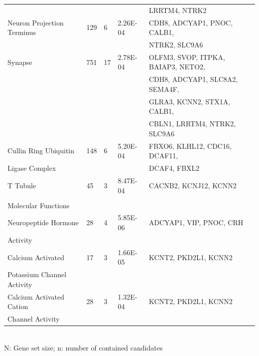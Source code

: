 \begin{refsection}
\begin{table}[H]
\begin{tabular}{@{}lllll@{}}
                           &     &    &            & LRRTM4, NTRK2                      \\
Neuron Projection Terminus & 129 & 6  & 2.26E-04   & CDH8, ADCYAP1, PNOC, CALB1,        \\
                           &     &    &            & NTRK2, SLC9A6                      \\
Synapse                    & 751 & 17 & 2.78E-04   & OLFM3, SVOP, ITPKA, BAIAP3, NETO2, \\
                           &     &    &            & CDH8, ADCYAP1, SLC8A2, SEMA4F,     \\
                           &     &    &            & GLRA3, KCNN2, STX1A, CALB1,        \\
                           &     &    &            & CBLN1, LRRTM4, NTRK2, SLC9A6       \\
Cullin Ring Ubiquitin      & 148 & 6  & 5.20E-04   & FBXO6, KLHL12, CDC16, DCAF11,      \\
Ligase Complex             &     &    &            & DCAF4, FBXL2                       \\
T Tubule                   & 45  & 3  & 8.47E-04   & CACNB2, KCNJ12, KCNN2              \\
                           &     &    &            &                                    \\
Molecular Functions        &     &    &            &                                    \\
Neuropeptide Hormone       & 28  & 4  & 5.85E-06   & ADCYAP1, VIP, PNOC, CRH            \\
Activity                   &     &    &            &                                    \\
Calcium Activated          & 17  & 3  & 1.66E-05   & KCNT2, PKD2L1, KCNN2               \\
Potassium Channel Activity &     &    &            &                                    \\
Calcium Activated Cation   & 28  & 3  & 1.32E-04   & KCNT2, PKD2L1, KCNN2               \\ 
Channel Activity           &     &    &            &                                    \\ \hline
\end{tabular}\\
{\scriptsize N: Gene set size; n: number of contained candidates}
\end{table}



\end{refsection}
